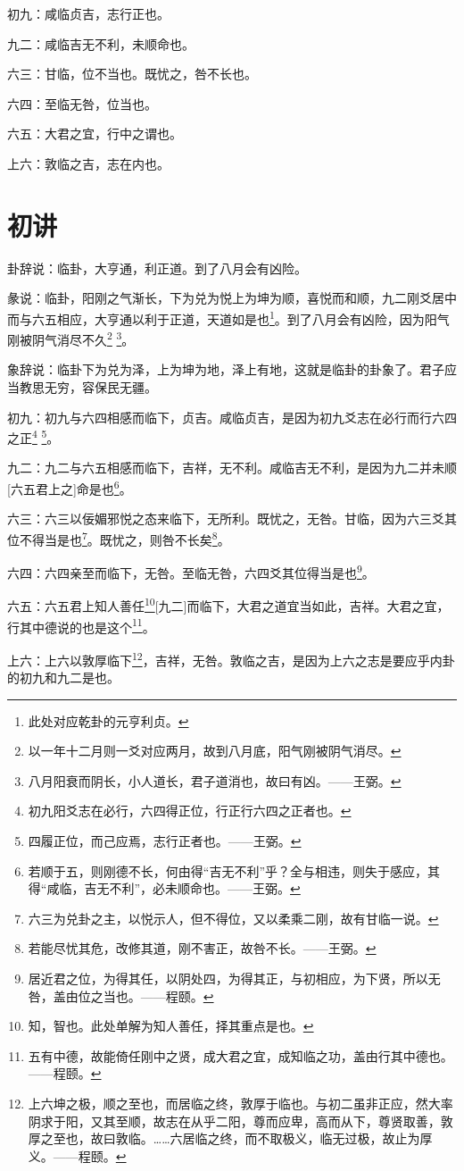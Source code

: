\documentclass[12pt,oneside]{book}
\begin{document}
初九：咸临贞吉，志行正也。

九二：咸临吉无不利，未顺命也。

六三：甘临，位不当也。既忧之，咎不长也。

六四：至临无咎，位当也。

六五：大君之宜，行中之谓也。

上六：敦临之吉，志在内也。

\section{初讲}
卦辞说：临卦，大亨通，利正道。到了八月会有凶险。

彖说：临卦，阳刚之气渐长，下为兑为悦上为坤为顺，喜悦而和顺，九二刚爻居中而与六五相应，大亨通以利于正道，天道如是也\footnote{此处对应乾卦的元亨利贞。}。到了八月会有凶险，因为阳气刚被阴气消尽不久\footnote{以一年十二月则一爻对应两月，故到八月底，阳气刚被阴气消尽。} \footnote{八月阳衰而阴长，小人道长，君子道消也，故曰有凶。——王弼。}。

象辞说：临卦下为兑为泽，上为坤为地，泽上有地，这就是临卦的卦象了。君子应当教思无穷，容保民无疆。

初九：初九与六四相感而临下，贞吉。咸临贞吉，是因为初九爻志在必行而行六四之正\footnote{初九阳爻志在必行，六四得正位，行正行六四之正者也。} \footnote{四履正位，而己应焉，志行正者也。——王弼。}。

九二：九二与六五相感而临下，吉祥，无不利。咸临吉无不利，是因为九二并未顺[六五君上之]命是也\footnote{若顺于五，则刚德不长，何由得“吉无不利”乎？全与相违，则失于感应，其得“咸临，吉无不利”，必未顺命也。——王弼。}。

六三：六三以佞媚邪悦之态来临下，无所利。既忧之，无咎。甘临，因为六三爻其位不得当是也\footnote{六三为兑卦之主，以悦示人，但不得位，又以柔乘二刚，故有甘临一说。}。既忧之，则咎不长矣\footnote{若能尽忧其危，改修其道，刚不害正，故咎不长。——王弼。}。

六四：六四亲至而临下，无咎。至临无咎，六四爻其位得当是也\footnote{居近君之位，为得其任，以阴处四，为得其正，与初相应，为下贤，所以无咎，盖由位之当也。——程颐。}。

六五：六五君上知人善任\footnote{知，智也。此处单解为知人善任，择其重点是也。}[九二]而临下，大君之道宜当如此，吉祥。大君之宜，行其中德说的也是这个\footnote{五有中德，故能倚任刚中之贤，成大君之宜，成知临之功，盖由行其中德也。——程颐。}。

上六：上六以敦厚临下\footnote{上六坤之极，顺之至也，而居临之终，敦厚于临也。与初二虽非正应，然大率阴求于阳，又其至顺，故志在从乎二阳，尊而应卑，高而从下，尊贤取善，敦厚之至也，故曰敦临。……六居临之终，而不取极义，临无过极，故止为厚义。——程颐。}，吉祥，无咎。敦临之吉，是因为上六之志是要应乎内卦的初九和九二是也。
\end{document}
